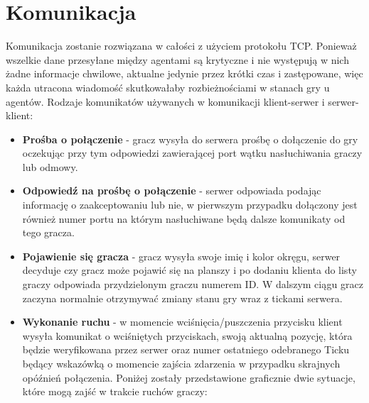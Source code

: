 \documentclass{article}
\begin{document}
\section{Komunikacja}
Komunikacja zostanie rozwiązana w całości z użyciem protokołu TCP. Ponieważ wszelkie dane przesyłane między agentami są krytyczne i nie występują w nich żadne informacje chwilowe, aktualne jedynie przez krótki czas i zastępowane, więc każda utracona wiadomość skutkowałaby rozbieżnościami w stanach gry u agentów.
Rodzaje komunikatów używanych w komunikacji klient-serwer i serwer-klient:
\begin{itemize}
    \item \textbf{Prośba o połączenie} - gracz wysyła do serwera prośbę o dołączenie do gry oczekując przy tym odpowiedzi zawierającej port wątku nasłuchiwania graczy lub odmowy.
    \item \textbf{Odpowiedź na prośbę o połączenie} - serwer odpowiada podając informację o zaakceptowaniu lub nie, w pierwszym
    przypadku dołączony jest również numer portu na którym nasłuchiwane będą dalsze komunikaty od tego gracza.    
    \item  \textbf{Pojawienie się gracza} - gracz wysyła swoje imię i kolor okręgu, serwer decyduje czy gracz może pojawić się
    na planszy i po dodaniu klienta do listy graczy odpowiada przydzielonym graczu numerem ID. W dalszym ciągu gracz zaczyna normalnie otrzymywać zmiany stanu gry wraz z tickami serwera.
    \item \textbf{Wykonanie ruchu} - w momencie wciśnięcia/puszczenia przycisku klient wysyła komunikat o wciśniętych przyciskach, swoją aktualną pozycję, która będzie weryfikowana przez serwer oraz numer ostatniego odebranego Ticku będący wskazówką o momencie zajścia zdarzenia w przypadku skrajnych opóźnień połączenia.
     Poniżej zostały przedstawione graficznie dwie sytuacje, które mogą zajść w trakcie ruchów graczy:
     \begin{figure}[h]
        \centering
        \begin{subfigure}{.5\textwidth}
          \centering

\end{subfigure}
\end{figure}
\end{itemize}
\end{document}
